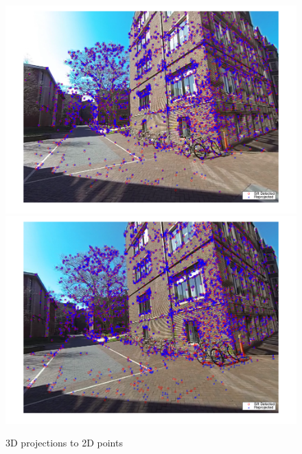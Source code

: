 \documentclass[10pt,letterpaper]{article}
\begin{document}
\begin{enumerate}[]
\begin{figure}[h!]
 \center
  \includegraphics[width=5in]{../images/final-img3}
  \includegraphics[width=5in]{../images/final-img4}
  \caption
  {3D projections to 2D points}
\end{figure} \\


\end{enumerate}
\end{document}
